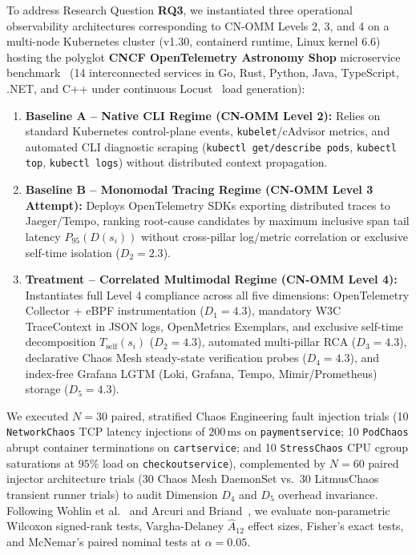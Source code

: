 To address Research Question \textbf{RQ3}, we instantiated three operational observability architectures corresponding to CN-OMM Levels 2, 3, and 4 on a multi-node Kubernetes cluster (v1.30, containerd runtime, Linux kernel 6.6) hosting the polyglot \textbf{CNCF OpenTelemetry Astronomy Shop} microservice benchmark~\cite{opentelemetry_demo, wang2024building} (14 interconnected services in Go, Rust, Python, Java, TypeScript, .NET, and C++ under continuous Locust~\cite{locust_framework} load generation):
\begin{enumerate}[leftmargin=*, nosep]
    \item \textbf{Baseline A -- Native CLI Regime (CN-OMM Level 2):} Relies on standard Kubernetes control-plane events, \texttt{kubelet}/cAdvisor metrics, and automated CLI diagnostic scraping (\texttt{kubectl get/describe pods}, \texttt{kubectl top}, \texttt{kubectl logs}) without distributed context propagation.
    \item \textbf{Baseline B -- Monomodal Tracing Regime (CN-OMM Level 3 Attempt):} Deploys OpenTelemetry SDKs exporting distributed traces to Jaeger/Tempo, ranking root-cause candidates by maximum inclusive span tail latency $P_{95}(D(s_i))$ without cross-pillar log/metric correlation or exclusive self-time isolation ($D_2 = 2.3$).
    \item \textbf{Treatment -- Correlated Multimodal Regime (CN-OMM Level 4):} Instantiates full Level 4 compliance across all five dimensions: OpenTelemetry Collector + eBPF instrumentation ($D_1 = 4.3$), mandatory W3C TraceContext in JSON logs, OpenMetrics Exemplars, and exclusive self-time decomposition $T_{\text{self}}(s_i)$ ($D_2 = 4.3$), automated multi-pillar RCA ($D_3 = 4.3$), declarative Chaos Mesh steady-state verification probes ($D_4 = 4.3$), and index-free Grafana LGTM (Loki, Grafana, Tempo, Mimir/Prometheus) storage ($D_5 = 4.3$).
\end{enumerate}

We executed $N = 30$ paired, stratified Chaos Engineering fault injection trials (10 \texttt{NetworkChaos} TCP latency injections of $200\,\text{ms}$ on \texttt{paymentservice}; 10 \texttt{PodChaos} abrupt container terminations on \texttt{cartservice}; and 10 \texttt{StressChaos} CPU cgroup saturations at $95\%$ load on \texttt{checkoutservice}), complemented by $N = 60$ paired injector architecture trials (30 Chaos Mesh DaemonSet vs.\ 30 LitmusChaos transient runner trials) to audit Dimension $D_4$ and $D_5$ overhead invariance. Following Wohlin et al.~\cite{wohlin_2012} and Arcuri and Briand~\cite{arcuri_2014}, we evaluate non-parametric Wilcoxon signed-rank tests, Vargha-Delaney $\hat{A}_{12}$ effect sizes, Fisher's exact tests, and McNemar's paired nominal tests at $\alpha = 0.05$.


